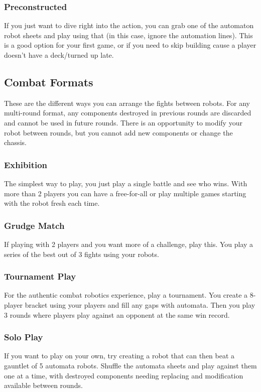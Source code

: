 \documentclass[11pt,a4paper]{article}
\begin{document}
\subsubsection{Preconstructed}

If you just want to dive right into the action, you can grab one of the automaton robot sheets and play using that (in this case, ignore the automation lines).
This is a good option for your first game, or if you need to skip building cause a player doesn't have a deck/turned up late.

\subsection{Combat Formats}
These are the different ways you can arrange the fights between robots.
For any multi-round format, any components destroyed in previous rounds are discarded and cannot be used in future rounds.
There is an opportunity to modify your robot between rounds, but you cannot add new components or change the chassis.


\subsubsection{Exhibition}
The simplest way to play, you just play a single battle and see who wins.
With more than 2 players you can have a free-for-all or play multiple games starting with 
the robot fresh each time.

\subsubsection{Grudge Match}
If playing with 2 players and you want more of a challenge, play this.
You play a series of the best out of 3 fights using your robots.

\subsubsection{Tournament Play}
For the authentic combat robotics experience, play a tournament.
You create a 8-player bracket using your players and fill any gaps with automata.
Then you play 3 rounds where players play against an opponent at the same win record. 

\subsubsection{Solo Play}
If you want to play on your own, try creating a robot that can then beat a gauntlet of 5 automata robots.
Shuffle the automata sheets and play against them one at a time, with destroyed components needing replacing and modification available between rounds.
\end{document}
